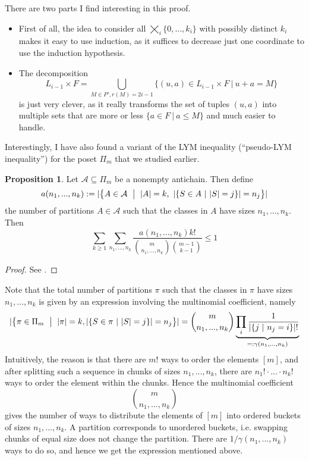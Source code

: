 \documentclass{scrartcl}
\theoremstyle{definition}
\newtheorem{proposition}[definition]{Proposition}
\begin{document}
There are two parts I find interesting in this proof.
\begin{itemize}
    \item First of all, the idea to consider all $\bigtimes_i \{ 0, ..., k_i \}$ with possibly distinct $k_i$ makes it easy to use induction, as it suffices to decrease just one coordinate to use the induction hypothesis.
    \item The decomposition
    \begin{equation*}
        L_{i - 1} \times F = \bigcup_{M \in P', r(M) = 2i - 1} \{ (u, a) \in L_{i - 1} \times F \ | \ u + a = M \}
    \end{equation*}
    is just very clever, as it really transforms the set of tuples $(u, a)$ into multiple sets that are more or less $\{ a \in F \ | \ a \leq M \}$ and much easier to handle.
\end{itemize}
Interestingly, I have also found a variant of the LYM inequality (``pseudo-LYM inequality'') for the poset $\Pi_m$ that we studied earlier.
\begin{proposition}
    Let $\mathcal{A} \subseteq \Pi_m$ be a nonempty antichain. Then define
    \begin{equation*}
        a(n_1, ..., n_k) := |\bigl\{ A \in \mathcal{A} \ \bigm| \ |A| = k, \ |\{ S \in A \ | \ |S| = j \}| = n_j \bigr\}|
    \end{equation*}
    the number of partitions $A \in \mathcal{A}$ such that the classes in $A$ have sizes $n_1, ..., n_k$.
    Then
    \begin{equation*}
        \sum_{k \geq 1} \sum_{n_1, ..., n_k} \frac {a(n_1, ..., n_k) k!} {{m \choose n_1, ..., n_k} {m - 1 \choose k - 1}} \leq 1
    \end{equation*}
\end{proposition}
\begin{proof}
    See \cite{lym_partitions}.
\end{proof}
Note that the total number of partitions $\pi$ such that the classes in $\pi$ have sizes $n_1, ..., n_k$ is given by an expression involving the multinomial coefficient, namely
\begin{equation*}
    |\bigl\{ \pi \in \Pi_m \ \bigm| \ |\pi| = k, |\{ S \in \pi \ | \ |S| = j\}| = n_j \bigr\}| = {m \choose n_1, ..., n_k} \underbrace{ \prod_i \frac 1 {|\{ j \ | \ n_j = i\}|!} }_{=: \gamma(n_1, ..., n_k)}
\end{equation*}
Intuitively, the reason is that there are $m!$ ways to order the elements $[m]$, and after splitting such a sequence in chunks of sizes $n_1, ..., n_k$, there are $n_1! \cdot ... \cdot n_k!$ ways to order the element within the chunks.
Hence the multinomial coefficient
\begin{equation*}
    {m \choose n_1, ..., n_k}
\end{equation*}
gives the number of ways to distribute the elements of $[m]$ into ordered buckets of sizes $n_1, ..., n_k$.
A partition corresponds to unordered buckets, i.e. swapping chunks of equal size does not change the partition.
There are $1/\gamma(n_1, ..., n_k)$ ways to do so, and hence we get the expression mentioned above.
\end{document}
